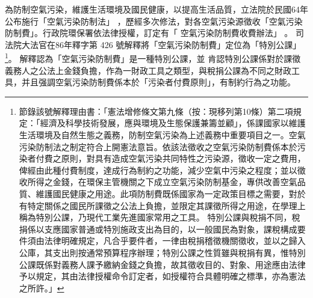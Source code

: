 \documentclass[12pt,a4paper]{article}
\begin{document}
為防制空氣污染，維護生活環境及國民健康，以提高生活品質，立法院於民國64年公布施行「空氣污染防制法」
，歷經多次修法，對各空氣污染源徵收「空氣污染防制費」。行政院環保署依法律授權，訂定有「	空氣污染防制費收費辦法」
。
司法院大法官在86年釋字第 426 號解釋將「空氣污染防制費」定位為「特別公課」
\footnote{節錄該號解釋理由書：「憲法增修條文第九條（按：現移列第10條）第二項規定：「經濟及科學技術發展，應與環境及生態保護兼籌並顧」，係課國家以維護生活環境及自然生態之義務，防制空氣污染為上述義務中重要項目之一。空氣污染防制法之制定符合上開憲法意旨。依該法徵收之空氣污染防制費係本於污染者付費之原則，對具有造成空氣污染共同特性之污染源，徵收一定之費用，俾經由此種付費制度，達成行為制約之功能，減少空氣中污染之程度；並以徵收所得之金錢，在環保主管機關之下成立空氣污染防制基金，專供改善空氣品質、維護國民健康之用途。此項防制費既係國家為一定政策目標之需要，對於有特定關係之國民所課徵之公法上負擔，並限定其課徵所得之用途，在學理上稱為特別公課，乃現代工業先進國家常用之工具。
特別公課與稅捐不同，稅捐係以支應國家普通或特別施政支出為目的，以一般國民為對象，課稅構成要件須由法律明確規定，凡合乎要件者，一律由稅捐稽徵機關徵收，並以之歸入公庫，其支出則按通常預算程序辦理；特別公課之性質雖與稅捐有異，惟特別公課既係對義務人課予繳納金錢之負擔，故其徵收目的、對象、用途應由法律予以規定，其由法律授權命令訂定者，如授權符合具體明確之標準，亦為憲法之所許。」}。
解釋認為「空氣污染防制費」是一種特別公課，並
肯認特別公課係對於課徵義務人之公法上金錢負擔，作為一財政工具之類型，與稅捐公課為不同之財政工具，并且强調空氣污染防制費係本於「污染者付費原則」，有制約行為之功能。
\end{document}
